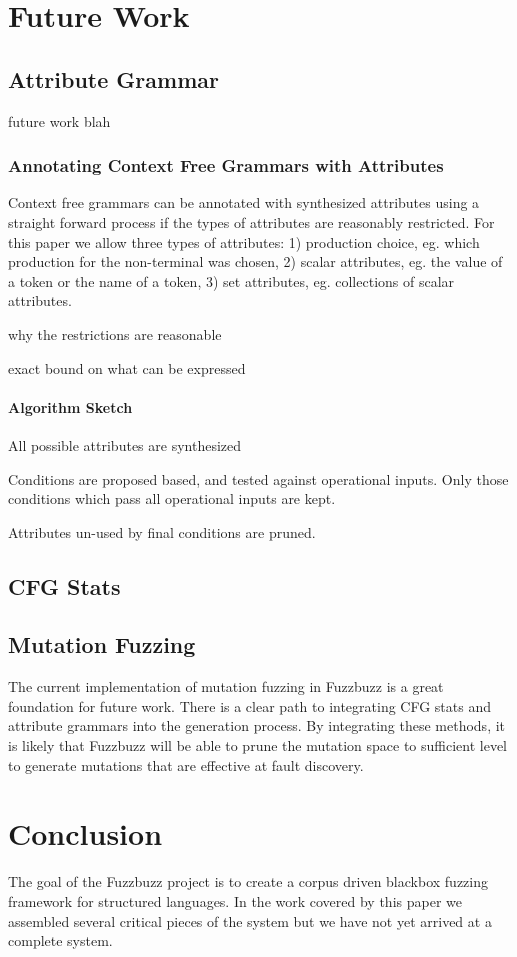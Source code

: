 \section{Future Work} \subsection{Attribute Grammar} future work blah
\subsubsection{Annotating Context Free Grammars with Attributes}

Context free grammars can be annotated with synthesized attributes using a
straight forward process if the types of attributes are reasonably restricted.
For this paper we allow three types of attributes: 1) production choice, eg.
which production for the non-terminal was chosen, 2) scalar attributes, eg. the
value of a token or the name of a token, 3) set attributes, eg. collections of
scalar attributes. 

why the restrictions are reasonable 

exact bound on what can be expressed

\paragraph{Algorithm Sketch}

All possible attributes are synthesized

Conditions are proposed based, and tested against operational inputs. Only those
conditions which pass all operational inputs are kept.

Attributes un-used by final conditions are pruned.

\subsection{CFG Stats}

\subsection{Mutation Fuzzing} The current implementation of mutation fuzzing in
Fuzzbuzz is a great foundation for future work. There is a clear path to
integrating CFG stats and attribute grammars into the generation process. By
integrating these methods, it is likely that Fuzzbuzz will be able to prune the
mutation space to sufficient level to generate mutations that are effective at
fault discovery.

\section{Conclusion}

The goal of the Fuzzbuzz project is to create a corpus driven blackbox fuzzing
framework for structured languages. In the work covered by this paper we
assembled several critical pieces of the system but we have not yet arrived at a
complete system.

